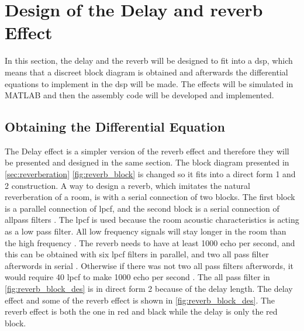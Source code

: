 \section{Design of the Delay and \gls{reverb} Effect}\label{sec:reverb_develop}
In this section, the delay and the \gls{reverb} will be designed to fit into a \gls{dsp}, which means that a discreet block diagram is obtained and afterwards the differential equations to implement in the \gls{dsp} will be made. The effects will be simulated in MATLAB and then the assembly code will be developed and implemented. 


\subsection{Obtaining the Differential Equation}
The Delay effect is a simpler version of the \gls{reverb} effect and therefore they will be presented and designed in the same section. The block diagram presented in \autoref{sec:reverberation} \autoref{fig:reverb_block} is changed so it fits into a direct form 1 and 2 construction.
A way to design a \gls{reverb}, which imitates the natural reverberation of a room, is with a serial connection of two blocks. The first block is a parallel connection of \gls{lpcf}, and the second block is a serial connection of allpass filters \citep{natural_sounding_revorb}. 
The \gls{lpcf} is used because the room acoustic characteristics is acting as a low pass filter. All low frequency signals will stay longer in the room than the high frequency \citep{rfi}. The \gls{reverb} needs to have at least 1000 echo per second, and this can be obtained with six \gls{lpcf} filters in parallel, and two all pass filter afterwords in serial \citep{DAFX}. Otherwise if there was not two all pass filters afterwords, it would require 40 \gls{lpcf} to make 1000 echo per second \citep{natural_sounding_revorb}. The all pass filter in \autoref{fig:reverb_block_des} is in direct form 2 because of the delay length. The delay effect and some of the \gls{reverb} effect is shown in \autoref{fig:reverb_block_des}. The \gls{reverb} effect is both the one in red and black while the delay is only the red block. 

\newpage

